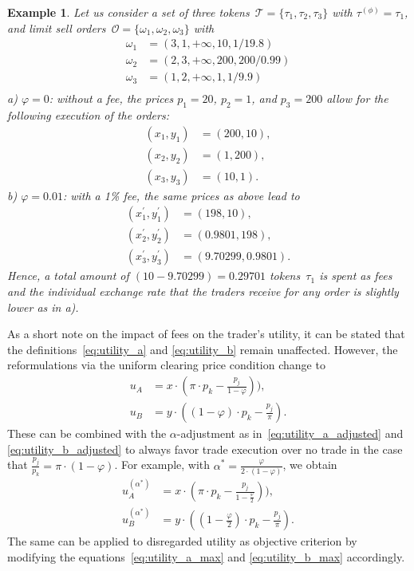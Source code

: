 \documentclass[11pt,parskip=full]{scrartcl}%
\newtheorem{example}[theorem]{Example}
\begin{document}
\begin{example}
  Let us consider a set of three tokens~$\mathcal{T} = \{\tau_1,\tau_2,\tau_3\}$ with $\tau^{(\phi)} = \tau_1$, and limit sell orders~$\mathcal{O} = \{\omega_1,\omega_2,\omega_3\}$ with
  \begin{align*}
    \omega_1 &= (3,1,+\infty,10,1/19.8) \\
    \omega_2 &= (2,3,+\infty,200,200/0.99) \\
    \omega_3 &= (1,2,+\infty,1,1/9.9) \\
  \end{align*}
  a) $\varphi = 0$: without a fee, the prices $p_1 = 20$, $p_2 = 1$, and $p_3 = 200$ allow for the following execution of the orders:
  \begin{align*}
    (x_1,y_1) &= (200,10), \\
    (x_2,y_2) &= (1,200), \\
    (x_3,y_3) &= (10,1).
  \end{align*}
  b) $\varphi = 0.01$: with a 1\% fee, the same prices as above lead to
  \begin{align*}
    (x_1^{'},y_1^{'}) &= (198,10), \\
    (x_2^{'},y_2^{'}) &= (0.9801,198), \\
    (x_3^{'},y_3^{'}) &= (9.70299,0.9801).
  \end{align*}
  Hence, a total amount of $(10-9.70299) = 0.29701$ tokens~$\tau_1$ is spent as fees and the individual exchange rate that the traders receive for any order is slightly lower as in a).
\end{example}

As a short note on the impact of fees on the trader's utility, it can be stated that the definitions~\eqref{eq:utility_a} and \eqref{eq:utility_b} remain unaffected.
However, the reformulations via the uniform clearing price condition change to
\begin{subequations}
\begin{align*}
  u_A &= x \cdot (\pi \cdot p_k - \frac{p_j}{1-\varphi})), \\[2mm]
  u_B &= y \cdot ((1-\varphi) \cdot p_k - \frac{p_j}{\pi}).
\end{align*}
\end{subequations}
These can be combined with the $\alpha$-adjustment as in~\eqref{eq:utility_a_adjusted} and \eqref{eq:utility_b_adjusted} to always favor trade execution over no trade in the case that $\frac{p_j}{p_k} = \pi \cdot (1-\varphi)$.
For example, with $\alpha^* = \frac{\varphi}{2 \cdot (1-\varphi)}$, we obtain
\begin{subequations}
\begin{align*}
  u_A^{(\alpha^*)} &= x \cdot (\pi \cdot p_k - \frac{p_j}{1-\frac{\varphi}{2}})), \\[2mm]
  u_B^{(\alpha^*)} &= y \cdot ((1-\frac{\varphi}{2}) \cdot p_k - \frac{p_j}{\pi}).
\end{align*}
\end{subequations}
The same can be applied to disregarded utility as objective criterion by modifying the equations~\eqref{eq:utility_a_max} and \eqref{eq:utility_b_max} accordingly.
\end{document}
